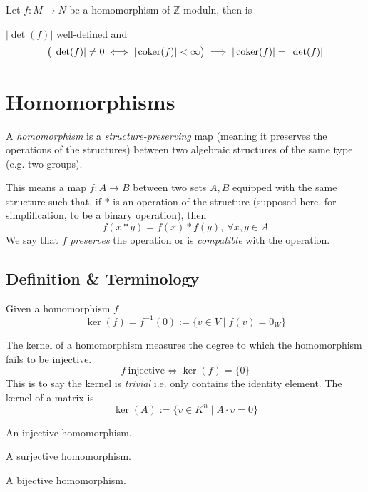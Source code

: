 \begin{corollary}
   Let \(f: M \to N\) be a homomorphism of \(\mathbb{Z}\)-moduln, then is

   \(|\det(f)|\) well-defined and
   \[\big(|\det(f)| \neq 0 \iff |\operatorname{coker}(f)| < \infty\big) \implies |\operatorname{coker}(f)| = |\det(f)|\]
\end{corollary}

\section{Homomorphisms}
A \emph{homomorphism} is a \emph{structure-preserving} map (meaning it preserves the operations of the structures) between two algebraic structures of the same type (e.g. two groups).

This means a map \(f: A \to B\) between two sets \(A, B\) equipped with the same structure such that, if \(\ast\) is an operation of the structure (supposed here, for simplification, to be a binary operation), then
\[f(x\ast y) = f(x) \ast f(y),~\forall x,y \in A\]
We say that \(f\) \emph{preserves} the operation or is \emph{compatible} with the operation.

\subsection{Definition \& Terminology}
\begin{definition}
   Given a homomorphism \(f\)
   \[\ker(f) = f^{-1}(0) := \{v \in V \mid f(v) = 0_W\}\]
\end{definition}
\begin{remark}[Intuition]
   The kernel of a homomorphism measures the degree to which the homomorphism fails to be injective.
   \[f~\text{injective} \iff \ker(f) = \{0\}\]
   This is to say the kernel is \emph{trivial} i.e. only contains the identity element.
   The kernel of a matrix is
   \[\ker(A) := \{v \in K^n \mid A \cdot v = 0\}\]
\end{remark}

\begin{definition}[Monomorphism]
   An injective homomorphism.
\end{definition}

\begin{definition}[Epimorphism]
   A surjective homomorphism.
\end{definition}

\begin{definition}[Isomorphism]
   A bijective homomorphism.
\end{definition}

